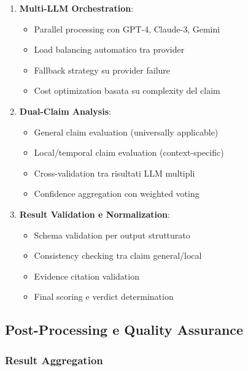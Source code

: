 \documentclass[12pt,a4paper]{report}
\begin{document}
\begin{enumerate}
    \item \textbf{Multi-LLM Orchestration}:
    \begin{itemize}
        \item Parallel processing con GPT-4, Claude-3, Gemini
        \item Load balancing automatico tra provider
        \item Fallback strategy su provider failure
        \item Cost optimization basata su complexity del claim
    \end{itemize}
    
    \item \textbf{Dual-Claim Analysis}:
    \begin{itemize}
        \item General claim evaluation (universally applicable)
        \item Local/temporal claim evaluation (context-specific)
        \item Cross-validation tra risultati LLM multipli
        \item Confidence aggregation con weighted voting
    \end{itemize}
    
    \item \textbf{Result Validation e Normalization}:
    \begin{itemize}
        \item Schema validation per output strutturato
        \item Consistency checking tra claim general/local
        \item Evidence citation validation
        \item Final scoring e verdict determination
    \end{itemize}
\end{enumerate}

\subsection{Post-Processing e Quality Assurance}

\subsubsection{Result Aggregation}
\end{document}
